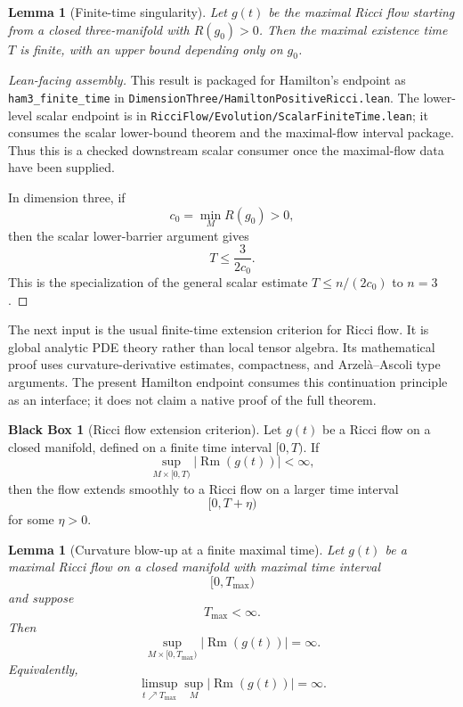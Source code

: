 \documentclass[11pt]{article}
\theoremstyle{plain}
\newtheorem{lemma}[theorem]{Lemma}
\theoremstyle{definition}
\newtheorem{blackbox}[theorem]{Black Box}
\theoremstyle{remark}
\newcommand{\Rm}{\operatorname{Rm}}
\newcommand{\norm}[1]{\left|#1\right|}
\newcommand{\leanref}[1]{\nolinkurl{#1}}
\newcommand{\leanfile}[1]{\nolinkurl{#1}}
\newcommand{\rffile}[1]{\leanfile{#1}}
\begin{document}
\begin{lemma}[Finite-time singularity]
\label{lem:finite-time}
Let $g(t)$ be the maximal Ricci flow starting from a closed three-manifold with
$R(g_0)>0$. Then the maximal existence time $T$ is finite, with an upper bound
depending only on $g_0$.
\end{lemma}

\begin{proof}[Lean-facing assembly]
This result is packaged for Hamilton's endpoint as \leanref{ham3_finite_time}
in \rffile{DimensionThree/HamiltonPositiveRicci.lean}.  The lower-level scalar endpoint is in
\rffile{RicciFlow/Evolution/ScalarFiniteTime.lean}; it consumes the scalar
lower-bound theorem and the maximal-flow interval package.  Thus this is a
checked downstream scalar consumer once the maximal-flow data have been
supplied.

In dimension three, if
\[
  c_0=\min_M R(g_0)>0,
\]
then the scalar lower-barrier argument gives
\[
  T\le \frac{3}{2c_0}.
\]
This is the specialization of the general scalar estimate
\(T\le n/(2c_0)\) to \(n=3\).
\end{proof}

The next input is the usual finite-time extension criterion for Ricci flow.
It is global analytic PDE theory rather than local tensor algebra.  Its
mathematical proof uses curvature-derivative estimates, compactness, and
Arzel\`a--Ascoli type arguments.  The present Hamilton endpoint consumes this
continuation principle as an interface; it does not claim a native proof of the
full theorem.

\begin{blackbox}[Ricci flow extension criterion]
\label{bb:rf-extension-criterion}
Let $g(t)$ be a Ricci flow on a closed manifold, defined on a finite time
interval $[0,T)$. If
\[
\sup_{M\times[0,T)} \norm{\Rm(g(t))}<\infty,
\]
then the flow extends smoothly to a Ricci flow on a larger time interval
\[
[0,T+\eta)
\]
for some $\eta>0$.
\end{blackbox}

\begin{lemma}[Curvature blow-up at a finite maximal time]
\label{lem:finite-time-curvature-blow-up}
Let $g(t)$ be a maximal Ricci flow on a closed manifold with maximal time
interval
\[
[0,T_{\max})
\]
and suppose
\[
T_{\max}<\infty.
\]
Then
\[
\sup_{M\times[0,T_{\max})}\norm{\Rm(g(t))}=\infty.
\]
Equivalently,
\[
\limsup_{t\nearrow T_{\max}}\sup_M\norm{\Rm(g(t))}=\infty.
\]
\end{lemma}
\end{document}
